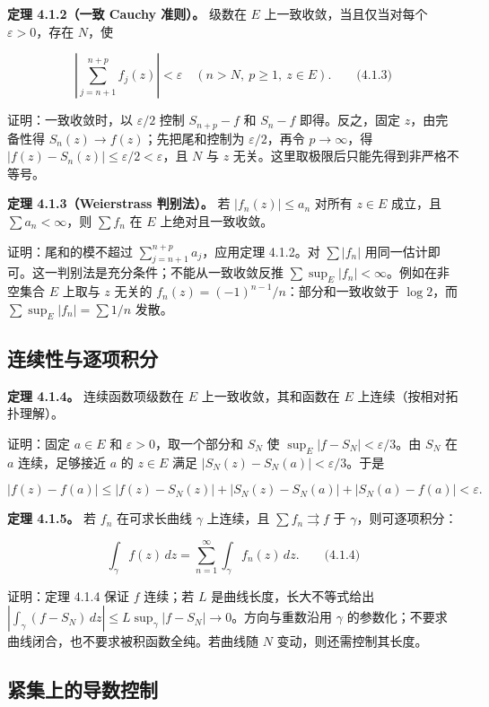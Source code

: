 \documentclass[11pt,a4paper]{article}
\begin{document}
\textbf{定理 4.1.2（一致 Cauchy 准则）。} 级数在 \(E\)
上一致收敛，当且仅当对每个 \(\varepsilon>0\)，存在 \(N\)，使

\[
\left|\sum_{j=n+1}^{n+p}f_j(z)\right|<\varepsilon
\quad(n>N,\ p\ge1,\ z\in E).
\qquad\text{(4.1.3)}
\]

证明：一致收敛时，以 \(\varepsilon/2\) 控制 \(S_{n+p}-f\) 和 \(S_n-f\)
即得。反之，固定 \(z\)，由完备性得 \(S_n(z)\to f(z)\)；先把尾和控制为
\(\varepsilon/2\)，再令 \(p\to\infty\)，得
\(|f(z)-S_n(z)|\le\varepsilon/2<\varepsilon\)，且 \(N\) 与 \(z\)
无关。这里取极限后只能先得到非严格不等号。

\textbf{定理 4.1.3（Weierstrass 判别法）。} 若 \(|f_n(z)|\le a_n\)
对所有 \(z\in E\) 成立，且 \(\sum a_n<\infty\)，则 \(\sum f_n\) 在 \(E\)
上绝对且一致收敛。

证明：尾和的模不超过 \(\sum_{j=n+1}^{n+p}a_j\)，应用定理 4.1.2。对
\(\sum|f_n|\) 用同一估计即可。这一判别法是充分条件；不能从一致收敛反推
\(\sum\sup_E|f_n|<\infty\)。例如在非空集合 \(E\) 上取与 \(z\) 无关的
\(f_n(z)=(-1)^{n-1}/n\)：部分和一致收敛于 \(\log2\)，而
\(\sum\sup_E|f_n|=\sum1/n\) 发散。

\subsection{连续性与逐项积分}\label{ch04-s1-heading-2}

\textbf{定理 4.1.4。} 连续函数项级数在 \(E\) 上一致收敛，其和函数在
\(E\) 上连续（按相对拓扑理解）。

证明：固定 \(a\in E\) 和 \(\varepsilon>0\)，取一个部分和 \(S_N\) 使
\(\sup_E|f-S_N|<\varepsilon/3\)。由 \(S_N\) 在 \(a\) 连续，足够接近
\(a\) 的 \(z\in E\) 满足 \(|S_N(z)-S_N(a)|<\varepsilon/3\)。于是

\[
|f(z)-f(a)|\le |f(z)-S_N(z)|+|S_N(z)-S_N(a)|+|S_N(a)-f(a)|<\varepsilon.
\]

\textbf{定理 4.1.5。} 若 \(f_n\) 在可求长曲线 \(\gamma\) 上连续，且
\(\sum f_n\rightrightarrows f\) 于 \(\gamma\)，则可逐项积分：

\[
\int_\gamma f(z)\,dz=\sum_{n=1}^{\infty}\int_\gamma f_n(z)\,dz.
\qquad\text{(4.1.4)}
\]

证明：定理 4.1.4 保证 \(f\) 连续；若 \(L\) 是曲线长度，长大不等式给出
\(|\int_\gamma(f-S_N)\,dz|\le L\sup_\gamma|f-S_N|\to0\)。方向与重数沿用
\(\gamma\) 的参数化；不要求曲线闭合，也不要求被积函数全纯。若曲线随
\(N\) 变动，则还需控制其长度。

\subsection{紧集上的导数控制}\label{ch04-s1-heading-3}
\end{document}
